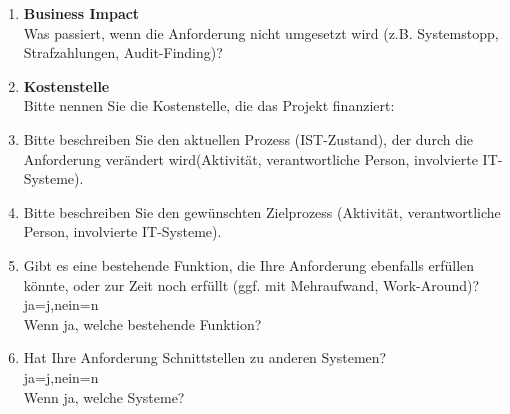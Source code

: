 \begin{Form}
\begin{enumerate}
		\item \textbf{Business Impact} \\
		      Was passiert, wenn die Anforderung nicht umgesetzt wird (z.B. Systemstopp, Strafzahlungen, Audit-Finding)?   \\
		      \TextField[charsize=0pt, donotscroll, multiline, name=business,width=0.9\textwidth,  height=3cm, value={}]{}

		\item \textbf{Kostenstelle} \\
		      Bitte nennen Sie die Kostenstelle, die das Projekt finanziert: \TextField[name=kosten, width=3.5cm, value={}]{}

		\item Bitte beschreiben Sie den aktuellen Prozess (IST-Zustand), der durch die Anforderung verändert wird(Aktivität, verantwortliche Person, involvierte IT-Systeme). \\
		      \TextField[charsize=0pt, donotscroll, multiline, ,width=0.9\textwidth,  height=3cm, value={}, name=process]{}

		\item Bitte beschreiben Sie den gewünschten Zielprozess (Aktivität, verantwortliche Person, involvierte IT-Systeme). \\
		      \TextField[charsize=0pt, donotscroll, multiline, width=0.9\textwidth,  height=3cm, value={}, name=descrgoal]{}

		\item Gibt es eine bestehende Funktion, die Ihre Anforderung ebenfalls erfüllen könnte, oder zur Zeit noch erfüllt (ggf. mit Mehraufwand, Work-Around)? \\
		      \ChoiceMenu[radio, radiosymbol=6 default=n, width=0.5cm, name=func]{} {ja=j,nein=n} \\
		      Wenn ja, welche bestehende Funktion? \\
		      \TextField[charsize=0pt, donotscroll, multiline,width=0.9\textwidth,  height=3cm, value={}, name=jfunc]{}

		      \newpage

		\item Hat Ihre Anforderung Schnittstellen zu anderen Systemen? \\
		      \ChoiceMenu[radio, radiosymbol=6 default=n, width=0.5cm, name=consesyst]{} {ja=j,nein=n} \\
		      Wenn ja, welche Systeme? \\
		      \TextField[charsize=0pt, donotscroll, multiline, name=jconsesyst,width=0.9\textwidth,  height=3cm, value={}]{}


\end{enumerate}
\end{Form}
